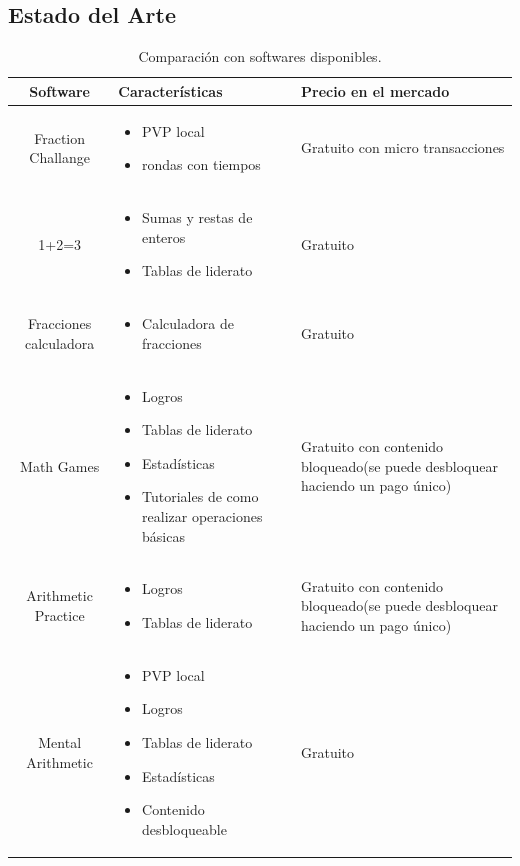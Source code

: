 \documentclass{article}
\begin{document}
\subsection{Estado del Arte}
\begin{table}[H]
\centering
\begin{tabular}{|c|M{6cm}|M{5cm}|}
\hline
Software & Características & Precio en el mercado \\ \hline

Fraction Challange & 
\begin{itemize}
	\item PVP local
	\item rondas con tiempos
\end{itemize} & 
Gratuito con micro transacciones \\ \hline


1+2=3 & 
\begin{itemize}
	\item Sumas y restas de enteros
	\item Tablas de liderato 
\end{itemize}& 
Gratuito \\ \hline


Fracciones calculadora & 
\begin{itemize}
	\item Calculadora de fracciones
\end{itemize}& 
Gratuito \\ \hline


Math Games & 
\begin{itemize}
	\item Logros
	\item Tablas de liderato
	\item Estadísticas
	\item Tutoriales de como realizar operaciones básicas
\end{itemize} & 
Gratuito con contenido bloqueado(se puede desbloquear haciendo un pago único) \\ \hline

Arithmetic Practice & 
\begin{itemize}
	\item Logros
	\item Tablas de liderato
\end{itemize} & 
Gratuito con contenido bloqueado(se puede desbloquear haciendo un pago único) \\ \hline


Mental Arithmetic  & 
\begin{itemize}
	\item PVP local
	\item Logros
	\item Tablas de liderato
	\item Estadísticas
	\item Contenido desbloqueable
\end{itemize} & 
Gratuito \\ \hline

\end{tabular}
\label{tab:software}
\caption{Comparación con softwares disponibles.}
\end{table}
\end{document}
